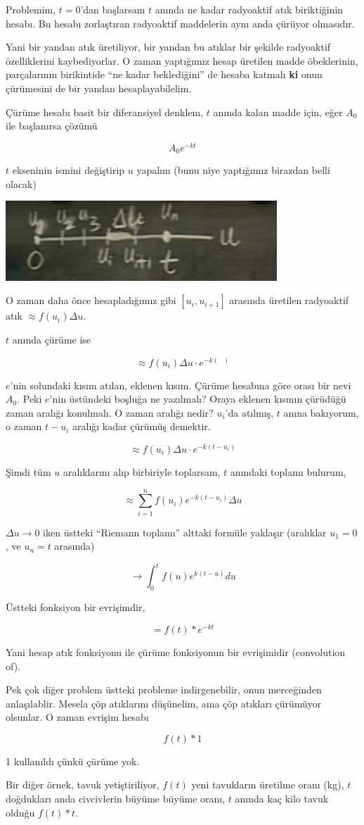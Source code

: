 \documentclass[12pt,fleqn]{article}\usepackage{../../common}
\begin{document}
Problemim, $t=0$'dan başlarsam $t$ anında ne kadar radyoaktif atık biriktiğinin
hesabı. Bu hesabı zorlaştıran radyoaktif maddelerin aynı anda çürüyor olmasıdır.

Yani bir yandan atık üretiliyor, bir yandan bu atıklar bir şekilde radyoaktif
özelliklerini kaybediyorlar. O zaman yaptığımız hesap üretilen madde
öbeklerinin, parçalarının birikintide ``ne kadar beklediğini'' de hesaba katmalı
\textbf{ki} onun çürümesini de bir yandan hesaplayabilelim.

Çürüme hesabı basit bir diferansiyel denklem, $t$ anında kalan madde için,
eğer $A_0$ ile başlanırsa çözümü

$$ A_0e^{-kt} $$

$t$ ekseninin ismini değiştirip $u$ yapalım (bunu niye yaptığımız birazdan belli
olacak)

\includegraphics[height=3cm]{21_4.png}

O zaman daha önce hesapladığımız gibi $[u_i,u_{i+1}]$ arasında üretilen
radyoaktif atık $\approx f(u_i)\Delta u$.

$t$ anında çürüme ise 

$$  \approx f(u_i)\Delta u \cdot e^{-k ( \ \ \ )}$$

$e$'nin solundaki kısım atılan, eklenen kısım. Çürüme hesabına göre orası bir
nevi $A_0$. Peki $e$'nin üstündeki boşluğa ne yazılmalı? Oraya eklenen kısmın
çürüdüğü zaman aralığı konulmalı. O zaman aralığı nedir? $u_i$'da atılmış, $t$
anına bakıyorum, o zaman $t-u_i$ aralığı kadar çürümüş demektir.

$$  \approx f(u_i)\Delta u \cdot e^{-k ( t-u_i )}$$

Şimdi tüm $u$ aralıklarını alıp birbiriyle toplarsam, $t$ anındaki toplamı
bulurum,

$$ \approx \sum_{i=1}^{n} f(u_i) e^{-k(t-u_i)} \Delta u $$

$\Delta u \to 0$ iken üstteki ``Riemann toplamı'' alttaki formüle yaklaşır
(aralıklar $u_1 = 0$, ve $u_n = t$ arasında)

$$ \to \int_0^{t} f(u) e^{k(t-u)}du $$

Üstteki fonksiyon bir evrişimdir, 

$$ = f(t) * e^{-kt} $$

Yani hesap atık fonksiyonu ile çürüme fonksiyonun bir evrişimidir (convolution
of).

Pek çok diğer problem üstteki probleme indirgenebilir, onun merceğinden
anlaşılablir. Mesela çöp atıklarını düşünelim, ama çöp atıkları çürümüyor
olsunlar. O zaman evrişim hesabı

$$ f(t) * 1 $$

1 kullanıldı çünkü çürüme yok. 

Bir diğer örnek, tavuk yetiştiriliyor, $f(t)$ yeni tavukların üretilme oranı
(kg), $t$ doğdukları anda civcivlerin büyüme büyüme oranı, $t$ anında kaç kilo
tavuk olduğu $f(t) * t$.
\end{document}
